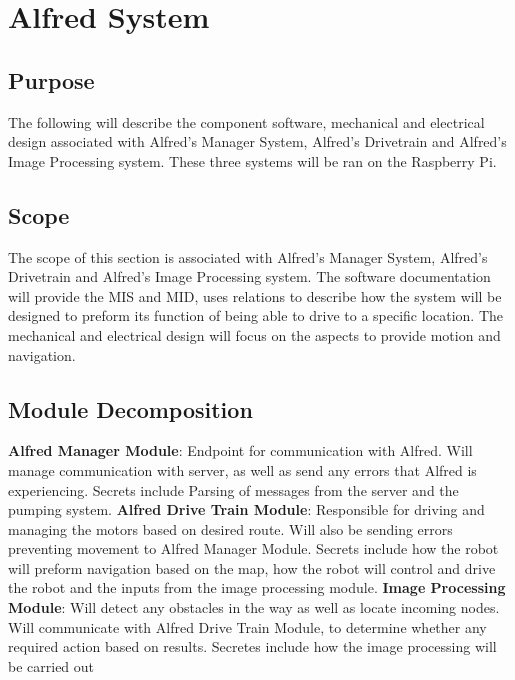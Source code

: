 \documentclass [10pt]{article}
\begin{document}


\section {Alfred System}


\subsection{Purpose}
The following will describe the component software, mechanical and electrical design associated with Alfred's Manager System, Alfred's Drivetrain and Alfred's Image Processing system. These three systems will be ran on the Raspberry Pi. 


\subsection{Scope}

The scope of this section is associated with Alfred's Manager System, Alfred's Drivetrain and Alfred's Image Processing system. The software documentation will provide the MIS and MID, uses relations to describe how the system will be designed to preform its function of being able to drive to a specific location. The mechanical and electrical design will focus on the aspects to provide motion and navigation.


\subsection{Module Decomposition}

\textbf{Alfred Manager Module}: Endpoint for communication with Alfred. Will manage communication with server, as well as send any errors that Alfred is experiencing. Secrets include Parsing of messages from the server and the pumping system. 
\textbf{Alfred Drive Train Module}: Responsible for driving and managing the motors based on desired route. Will also be sending errors preventing movement to Alfred Manager Module. Secrets include how the robot will preform navigation based on the map, how the robot will control and drive the robot and the inputs from the image processing module.
\textbf{Image Processing Module}: Will detect any obstacles in the way as well as locate incoming nodes. Will communicate with Alfred Drive Train Module, to determine whether any required action based on results. Secretes include how the image processing will be carried out
\end{document}
